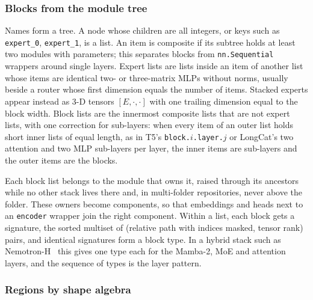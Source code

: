 \documentclass[11pt]{article}
\newcommand{\tn}[1]{\texttt{#1}}
\begin{document}
\subsubsection{Blocks from the module tree}
Names form a tree. A node whose children are all integers, or keys such as \tn{expert\_0}, \tn{expert\_1}, is a list. An item is composite if its subtree holds at least two modules with parameters; this separates blocks from \tn{nn.Sequential} wrappers around single layers. Expert lists are lists inside an item of another list whose items are identical two- or three-matrix MLPs without norms, usually beside a router whose first dimension equals the number of items. Stacked experts appear instead as 3-D tensors $[E, \cdot, \cdot]$ with one trailing dimension equal to the block width. Block lists are the innermost composite lists that are not expert lists, with one correction for sub-layers: when every item of an outer list holds short inner lists of equal length, as in T5's \tn{block.$i$.layer.$j$} or LongCat's two attention and two MLP sub-layers per layer, the inner items are sub-layers and the outer items are the blocks.

Each block list belongs to the module that owns it, raised through its ancestors while no other stack lives there and, in multi-folder repositories, never above the folder. These owners become components, so that embeddings and heads next to an \tn{encoder} wrapper join the right component. Within a list, each block gets a signature, the sorted multiset of (relative path with indices masked, tensor rank) pairs, and identical signatures form a block type. In a hybrid stack such as Nemotron-H~\citep{nemotronh2025} this gives one type each for the Mamba-2, MoE and attention layers, and the sequence of types is the layer pattern.

\subsubsection{Regions by shape algebra}
\end{document}
